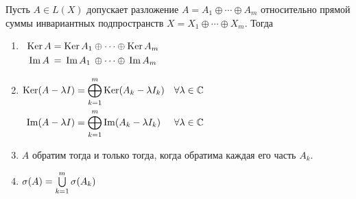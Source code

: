 \begin{theorem}\label{th:invarproperties}
    Пусть $A\in L(X)$ допускает разложение $A = A_1 \oplus \dotsb \oplus A_m$
    относительно прямой суммы инвариантных подпространств $ X = X_1 \oplus
    \dotsb \oplus X_m$. Тогда
    \begin{enumerate}
        \item $ 
            \begin{array}[t]{c @{{}={}} c @{{}\oplus \dotsb \oplus{}} c}
                \ker A & \ker A_1 & \ker A_m \\[0.3em]
                \im A & \im A_1 &\im A_m 
            \end{array} $
        \item $ 
            \begin{aligned}[t]
                \operatorname{Ker} (A-\lambda I) &= \bigoplus\limits_{k=1}^m \operatorname{Ker} (A_k -
                \lambda I_k) && \forall \lambda \in \mathbb{C} \\ 
                \operatorname{Im} (A-\lambda I) &= \bigoplus\limits_{k=1}^m \operatorname{Im} (A_k -
                \lambda I_k) && \forall \lambda \in \mathbb{C} 
            \end{aligned} $
        \item $A$ обратим тогда и только тогда, когда обратима каждая его часть
            $A_k$.
        \item $ \operatorname{\sigma}(A) = \bigcup\limits_{k=1}^m \operatorname{\sigma}(A_k) $
    \end{enumerate}
\end{theorem}

